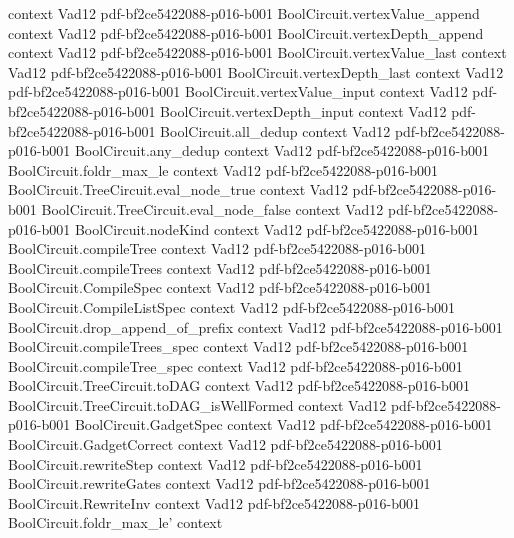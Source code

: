\begin{theorem}
  {context}
  {Vad12}
  {pdf-bf2ce5422088-p016-b001}
\proofstep
  {BoolCircuit.vertexValue_append}
  {context}
  {Vad12}
  {pdf-bf2ce5422088-p016-b001}
\proofstep
  {BoolCircuit.vertexDepth_append}
  {context}
  {Vad12}
  {pdf-bf2ce5422088-p016-b001}
\proofstep
  {BoolCircuit.vertexValue_last}
  {context}
  {Vad12}
  {pdf-bf2ce5422088-p016-b001}
\proofstep
  {BoolCircuit.vertexDepth_last}
  {context}
  {Vad12}
  {pdf-bf2ce5422088-p016-b001}
\proofstep
  {BoolCircuit.vertexValue_input}
  {context}
  {Vad12}
  {pdf-bf2ce5422088-p016-b001}
\proofstep
  {BoolCircuit.vertexDepth_input}
  {context}
  {Vad12}
  {pdf-bf2ce5422088-p016-b001}
\proofstep
  {BoolCircuit.all_dedup}
  {context}
  {Vad12}
  {pdf-bf2ce5422088-p016-b001}
\proofstep
  {BoolCircuit.any_dedup}
  {context}
  {Vad12}
  {pdf-bf2ce5422088-p016-b001}
\proofstep
  {BoolCircuit.foldr_max_le}
  {context}
  {Vad12}
  {pdf-bf2ce5422088-p016-b001}
\proofstep
  {BoolCircuit.TreeCircuit.eval_node_true}
  {context}
  {Vad12}
  {pdf-bf2ce5422088-p016-b001}
\proofstep
  {BoolCircuit.TreeCircuit.eval_node_false}
  {context}
  {Vad12}
  {pdf-bf2ce5422088-p016-b001}
\proofstep
  {BoolCircuit.nodeKind}
  {context}
  {Vad12}
  {pdf-bf2ce5422088-p016-b001}
\proofstep
  {BoolCircuit.compileTree}
  {context}
  {Vad12}
  {pdf-bf2ce5422088-p016-b001}
\proofstep
  {BoolCircuit.compileTrees}
  {context}
  {Vad12}
  {pdf-bf2ce5422088-p016-b001}
\proofstep
  {BoolCircuit.CompileSpec}
  {context}
  {Vad12}
  {pdf-bf2ce5422088-p016-b001}
\proofstep
  {BoolCircuit.CompileListSpec}
  {context}
  {Vad12}
  {pdf-bf2ce5422088-p016-b001}
\proofstep
  {BoolCircuit.drop_append_of_prefix}
  {context}
  {Vad12}
  {pdf-bf2ce5422088-p016-b001}
\proofstep
  {BoolCircuit.compileTrees_spec}
  {context}
  {Vad12}
  {pdf-bf2ce5422088-p016-b001}
\proofstep
  {BoolCircuit.compileTree_spec}
  {context}
  {Vad12}
  {pdf-bf2ce5422088-p016-b001}
\proofstep
  {BoolCircuit.TreeCircuit.toDAG}
  {context}
  {Vad12}
  {pdf-bf2ce5422088-p016-b001}
\proofstep
  {BoolCircuit.TreeCircuit.toDAG_isWellFormed}
  {context}
  {Vad12}
  {pdf-bf2ce5422088-p016-b001}
\proofstep
  {BoolCircuit.GadgetSpec}
  {context}
  {Vad12}
  {pdf-bf2ce5422088-p016-b001}
\proofstep
  {BoolCircuit.GadgetCorrect}
  {context}
  {Vad12}
  {pdf-bf2ce5422088-p016-b001}
\proofstep
  {BoolCircuit.rewriteStep}
  {context}
  {Vad12}
  {pdf-bf2ce5422088-p016-b001}
\proofstep
  {BoolCircuit.rewriteGates}
  {context}
  {Vad12}
  {pdf-bf2ce5422088-p016-b001}
\proofstep
  {BoolCircuit.RewriteInv}
  {context}
  {Vad12}
  {pdf-bf2ce5422088-p016-b001}
\proofstep
  {BoolCircuit.foldr_max_le'}
  {context}

\end{theorem}
